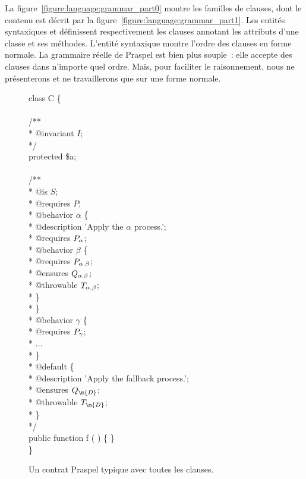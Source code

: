 La figure~\ref{figure:language:grammar_part0} montre les familles de clauses,
dont le contenu est décrit par la figure~\ref{figure:language:grammar_part1}.
Les entités syntaxiques  et 
définissent respectivement les clauses annotant les attributs d'une classe et
ses méthodes. L'entité syntaxique  montre l'ordre des
clauses en forme normale. La grammaire réelle de Praspel est bien plus souple~:
elle accepte des clauses dans n'importe quel ordre. Mais, pour faciliter le
raisonnement, nous ne présenterons et ne travaillerons que sur une forme
normale.

\begin{figure}
\begin{bigpre}
class C \{ \\
\\
    /** \\
     * @invariant \(I\); \\
     */ \\
    protected \$a; \\
\\
    /** \\
     * @is \(S\); \\
     * @requires \(P\); \\
     * @behavior \(\alpha\) \{ \\
     *     @description 'Apply the \(\alpha\) process.'; \\
     *     @requires \(P\sb{\alpha}\); \\
     *     @behavior \(\beta\) \{ \\
     *         @requires  \(P\sb{\alpha.\beta}\); \\
     *         @ensures   \(Q\sb{\alpha.\beta}\); \\
     *         @throwable \(T\sb{\alpha.\beta}\); \\
     *     \} \\
     * \} \\
     * @behavior \(\gamma\) \{ \\
     *     @requires \(P\sb{\gamma}\); \\
     *     \(\dots\) \\
     * \} \\
     * @default \{ \\
     *     @description 'Apply the fallback process.'; \\
     *     @ensures   \(Q\sb{\m{D}}\); \\
     *     @throwable \(T\sb{\m{D}}\); \\
     * \} \\
     */ \\
    public function f ( ) \{ \} \\
\}
\end{bigpre}

\caption{\label{figure:language:typical_contract} Un contrat Praspel typique
avec toutes les clauses.}

\end{figure}

